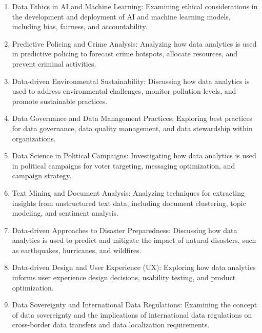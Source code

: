 \documentclass[12pt]{article}
\begin{document}
\begin{enumerate}
        \item Data Ethics in AI and Machine Learning: Examining ethical considerations in the development and deployment of AI and machine learning models, including bias, fairness, and accountability.
        \item Predictive Policing and Crime Analysis: Analyzing how data analytics is used in predictive policing to forecast crime hotspots, allocate resources, and prevent criminal activities.
        \item Data-driven Environmental Sustainability: Discussing how data analytics is used to address environmental challenges, monitor pollution levels, and promote sustainable practices.
        \item Data Governance and Data Management Practices: Exploring best practices for data governance, data quality management, and data stewardship within organizations.
        \item Data Science in Political Campaigns: Investigating how data analytics is used in political campaigns for voter targeting, messaging optimization, and campaign strategy.
        \item Text Mining and Document Analysis: Analyzing techniques for extracting insights from unstructured text data, including document clustering, topic modeling, and sentiment analysis.
        \item Data-driven Approaches to Disaster Preparedness: Discussing how data analytics is used to predict and mitigate the impact of natural disasters, such as earthquakes, hurricanes, and wildfires.
        \item Data-driven Design and User Experience (UX): Exploring how data analytics informs user experience design decisions, usability testing, and product optimization.
        \item Data Sovereignty and International Data Regulations: Examining the concept of data sovereignty and the implications of international data regulations on cross-border data transfers and data localization requirements.
    \end{enumerate}
\end{document}

